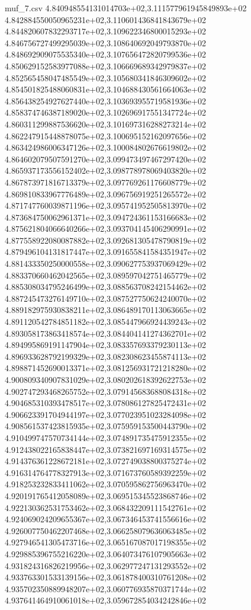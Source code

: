 \begin{filecontents*}{muf_7.csv}
4.840948554131014703e+02,3.111577961945849893e+02
4.842884550050965231e+02,3.110601436841843679e+02
4.844820607832293717e+02,3.109622346800015293e+02
4.846756727499295039e+02,3.108640692049793870e+02
4.848692909075535340e+02,3.107656472820799536e+02
4.850629152583977088e+02,3.106669689342979837e+02
4.852565458047485549e+02,3.105680341846309602e+02
4.854501825488060831e+02,3.104688430561664063e+02
4.856438254927627440e+02,3.103693955719581936e+02
4.858374746387189020e+02,3.102696917551347724e+02
4.860311299887536620e+02,3.101697316288273214e+02
4.862247915448878075e+02,3.100695152162097656e+02
4.863424986006347126e+02,3.100084802676619802e+02
4.864602079507591270e+02,3.099473497467297420e+02
4.865937173556152402e+02,3.098778978069403820e+02
4.867873971816713379e+02,3.097769261176608779e+02
4.869810833967776489e+02,3.096756919251265572e+02
4.871747760039871196e+02,3.095741952505813970e+02
4.873684750062961371e+02,3.094724361153166683e+02
4.875621804066640266e+02,3.093704145406290991e+02
4.877558922080087882e+02,3.092681305478790819e+02
4.879496104131817447e+02,3.091655841584351947e+02
4.881433350250000558e+02,3.090627753937069429e+02
4.883370660462042565e+02,3.089597042751465779e+02
4.885308034795246499e+02,3.088563708242154462e+02
4.887245473276149710e+02,3.087527750624240070e+02
4.889182975930838211e+02,3.086489170113063665e+02
4.891120542784851182e+02,3.085447966924439243e+02
4.893058173863418574e+02,3.084404141274362701e+02
4.894995869191147904e+02,3.083357693379230113e+02
4.896933628792199329e+02,3.082308623455874113e+02
4.898871452690013371e+02,3.081256931721218280e+02
4.900809340907831029e+02,3.080202618392622753e+02
4.902747293468265752e+02,3.079145683688084318e+02
4.904685310393478517e+02,3.078086127825472431e+02
4.906623391704944197e+02,3.077023951023284098e+02
4.908561537423815935e+02,3.075959153500443790e+02
4.910499747570734144e+02,3.074891735475912355e+02
4.912438022165838447e+02,3.073821697169314575e+02
4.914376361228672181e+02,3.072749038800375274e+02
4.916314764778327913e+02,3.071673760589392259e+02
4.918253232833411062e+02,3.070595862756963470e+02
4.920191765412058089e+02,3.069515345523868746e+02
4.922130362531753462e+02,3.068432209111542761e+02
4.924069024209655367e+02,3.067346453741556616e+02
4.926007750462207468e+02,3.066258079636063485e+02
4.927946541305473716e+02,3.065167087017198355e+02
4.929885396755216220e+02,3.064073476107905663e+02
4.931824316826219956e+02,3.062977247131293552e+02
4.933763301533139156e+02,3.061878400310761208e+02
4.935702350889948207e+02,3.060776935870371744e+02
4.937641464910061018e+02,3.059672854034242846e+02

\end{filecontents*}
